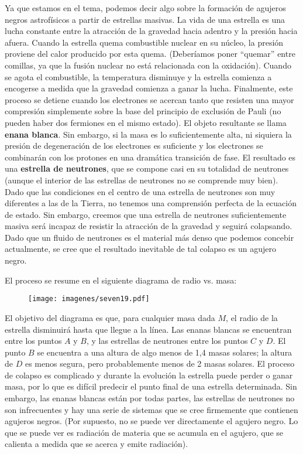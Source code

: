 \documentclass[11pt,b5paper,openany,twoside]{book}
\begin{document}
Ya que estamos en el tema, podemos decir algo sobre la formación de agujeros negros astrofísicos a partir de estrellas masivas.
La vida de una estrella es una lucha constante entre la atracción de la gravedad hacia adentro y la presión hacia afuera.
Cuando la estrella quema combustible nuclear en su núcleo, la presión proviene del calor producido por esta quema.
(Deberíamos poner ``quemar'' entre comillas, ya que la fusión nuclear no está relacionada con la oxidación).
Cuando se agota el combustible, la temperatura disminuye y la estrella comienza a encogerse a medida que la gravedad comienza a ganar la lucha.
Finalmente, este proceso se detiene cuando los electrones se acercan tanto que resisten una mayor compresión simplemente sobre la base del principio de exclusión de Pauli (no pueden haber dos fermiones en el mismo estado).
El objeto resultante se llama {\bf enana blanca}.
Sin embargo, si la masa es lo suficientemente alta, ni siquiera la presión de degeneración de los electrones es suficiente y los electrones se combinarán con los protones en una dramática transición de fase.
El resultado es una {\bf estrella de neutrones}, que se compone casi en su totalidad de neutrones (aunque el interior de las estrellas de neutrones no se comprende muy bien).
Dado que las condiciones en el centro de una estrella de neutrones son muy diferentes a las de la Tierra, no tenemos una comprensión perfecta de la ecuación de estado.
Sin embargo, creemos que una estrella de neutrones suficientemente masiva será incapaz de resistir la atracción de la gravedad y seguirá colapsando.
Dado que un fluido de neutrones es el material más denso que podemos concebir actualmente, se cree que el resultado inevitable de tal colapso es un agujero negro.

El proceso se resume en el siguiente diagrama de radio vs.
masa:

\begin{figure}[h]
\centering
\texttt{[image: imagenes/seven19.pdf]}
\end{figure}

\noindent
El objetivo del diagrama es que, para cualquier masa dada $M$, el radio de la estrella disminuirá hasta que llegue a la línea.
Las enanas blancas se encuentran entre los puntos $A$ y $B$, y las estrellas de neutrones entre los puntos $C$ y $D$.
El punto $B$ se encuentra a una altura de algo menos de 1,4 masas solares; la altura de $D$ es menos segura, pero probablemente menos de 2 masas solares.
El proceso de colapso es complicado y durante la evolución la estrella puede perder o ganar masa, por lo que es difícil predecir el punto final de una estrella determinada.
Sin embargo, las enanas blancas están por todas partes, las estrellas de neutrones no son infrecuentes y hay una serie de sistemas que se cree firmemente que contienen agujeros negros.
(Por supuesto, no se puede ver directamente el agujero negro.
Lo que se puede ver es radiación de materia que se acumula en el agujero, que se calienta a medida que se acerca y emite radiación).
\end{document}
